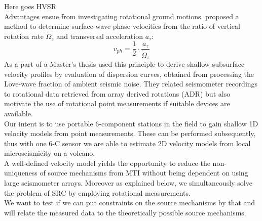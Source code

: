 \documentclass[12pt, a4paper]{article}
\begin{document}
Here goes HVSR\\

Advantages ensue from investigating rotational ground motions. \citet{Igel2005} proposed a method to determine surface-wave phase velocities from the ratio of vertical rotation rate $\dot{\Omega}_z$ and transversal acceleration $a_\tau$:
\begin{equation}
	v_{ph} = \frac{1}{2} \cdot \frac{a_\tau}{\dot{\Omega}_z}
\end{equation}
As a part of a Master's thesis \citet{Wietek2013} used this principle to derive shallow-subsurface velocity profiles by evaluation of dispersion curves, obtained from processing the Love-wave fraction of ambient seismic noise. They related seismometer recordings to rotational data retrieved from array derived rotations (ADR) but also motivate the use of rotational point measurements if suitable devices are available.\\
Our intent is to use portable 6-component stations in the field to gain shallow 1D velocity models from point measurements. These can be performed subsequently, thus with one 6-C sensor we are able to estimate 2D velocity models from local microseismicity on a volcano.\\

A well-defined velocity model yields the opportunity to reduce the non-uniqueness of source mechanisms from MTI without being dependent on using large seismometer arrays. Moreover as explained below, we simultaneously solve the problem of SRC by employing rotational measurements.\\
We want to test if we can put constraints on the source mechanisms by that and will relate the measured data to the theoretically possible source mechanisms.
\end{document}
